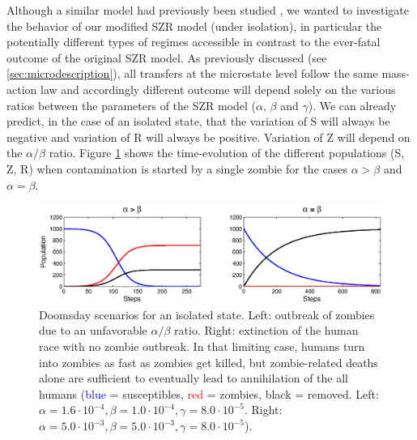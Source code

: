 \documentclass[11pt]{article} %
\begin{document}
Although a similar model had previously been studied \cite{munz2009zombies}, we wanted to investigate the behavior of our modified SZR model (under isolation), in particular the potentially different types of regimes accessible in contrast to the ever-fatal outcome of the original SZR model. As previously discussed (see \ref{sec:microdescription}), all transfers at the microstate level follow the same mass-action law and accordingly different outcome will depend solely on the various ratios between the parameters of the SZR model ($\alpha$, $\beta$ and  $\gamma$). We can already predict, in the case of an isolated state, that the variation of S will always be negative and variation of R will always be positive. Variation of Z will depend on the $\alpha/\beta$ ratio. Figure \ref{deathS} shows the time-evolution of the different populations (S, Z, R) when contamination is started by a single zombie for the cases $\alpha>\beta$ and $\alpha=\beta$.
\begin{figure}[h!]
\centerline{
\includegraphics[scale=0.65]{../images/Matlab_figures/model-AgeB.eps}}
\caption{Doomsday scenarios for an isolated state. Left: outbreak of zombies due to an unfavorable $\alpha/\beta$ ratio. Right: extinction of the human race with no zombie outbreak. In that limiting case, humans turn into zombies as fast as zombies get killed, but zombie-related deaths alone are sufficient to eventually lead to annihilation of the all humans (\textcolor{blue}{blue} = susceptibles, \textcolor{red}{red} = zombies, black = removed. Left: $\alpha=1.6\cdot10^{-4}, \beta=1.0\cdot10^{-4}, \gamma=8.0\cdot10^{-5}$. Right: $\alpha=5.0\cdot10^{-3}, \beta=5.0\cdot10^{-3}, \gamma=8.0\cdot10^{-5} $). \label{deathS} }
\end{figure}
\end{document}
